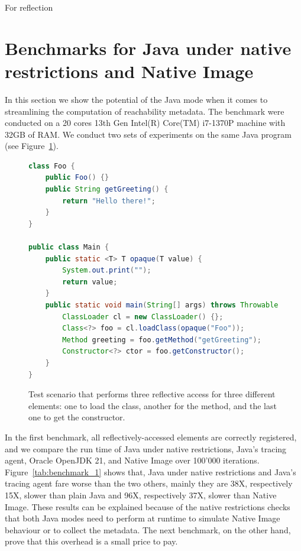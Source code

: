 For reflection 

\section{Benchmarks for Java under native restrictions and Native Image}\label{benchmark}
In this section we show the potential of the Java mode when it comes to streamlining the computation of reachability metadata. The benchmark were conducted on a 20 cores 13th Gen Intel(R) Core(TM) i7-1370P machine with 32GB of RAM. We conduct two sets of experiments on the same Java program (see Figure~\ref{fig:benchmark}). 

\begin{figure}[ht]
    \centering
\begin{lstlisting}[language=Java]
class Foo {
    public Foo() {}
    public String getGreeting() {
        return "Hello there!";
    }
}

public class Main {
    public static <T> T opaque(T value) {
        System.out.print("");
        return value;
    }
    public static void main(String[] args) throws Throwable {
        ClassLoader cl = new ClassLoader() {};
        Class<?> foo = cl.loadClass(opaque("Foo"));
        Method greeting = foo.getMethod("getGreeting");
        Constructor<?> ctor = foo.getConstructor();
    }
}
\end{lstlisting}
    \caption{Test scenario that performs three reflective access for three different elements: one to load the class, another for the method, and the last one to get the constructor.}
    \label{fig:benchmark}
\end{figure}

In the first benchmark, all reflectively-accessed elements are correctly registered, and we compare the run time of Java under native restrictions, Java's tracing agent, Oracle OpenJDK 21, and Native Image over 100'000 iterations. Figure~\ref{tab:benchmark_1} shows that, Java under native restrictions and Java's tracing agent fare worse than the two others, mainly they are 38X, respectively 15X, slower than plain Java and 96X, respectively 37X, slower than Native Image. These results can be explained because of the native restrictions checks that both Java modes need to perform at runtime to simulate Native Image behaviour or to collect the metadata. The next benchmark, on the other hand, prove that this overhead is a small price to pay.

